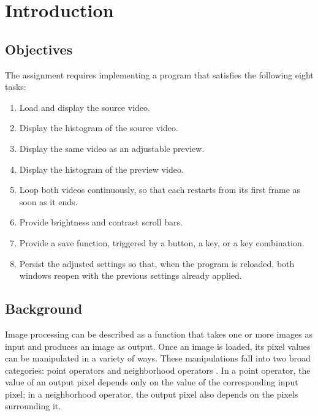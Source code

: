 \chapter{Introduction}
\label{ch:intro}



\section{Objectives}
\label{sec:objectives}

The assignment requires implementing a program that satisfies the
following eight tasks:

\begin{enumerate}
  \item Load and display the source video.
  \item Display the histogram of the source video.
  \item Display the same video as an adjustable preview.
  \item Display the histogram of the preview video.
  \item Loop both videos continuously, so that each restarts from its
        first frame as soon as it ends.
  \item Provide brightness and contrast scroll bars.
  \item Provide a save function, triggered by a button, a key, or a
        key combination.
  \item Persist the adjusted settings so that, when the program is
        reloaded, both windows reopen with the previous settings
        already applied.
\end{enumerate}


\section{Background}
\label{sec:background}

Image processing can be described as a function that takes one or
more images as input and produces an image as output. Once an image
is loaded, its pixel values can be manipulated in a variety of ways.
These manipulations fall into two broad categories: point operators
and neighborhood operators \citep{szeliski2022}. In a point operator,
the value of an output pixel depends only on the value of the
corresponding input pixel; in a neighborhood operator, the output
pixel also depends on the pixels surrounding it.

